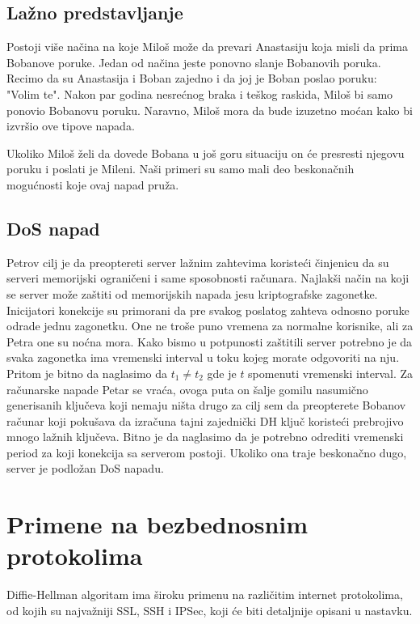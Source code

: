 \documentclass[a4paper]{article}
\begin{document}
\subsection{Lažno predstavljanje}
Postoji više načina na koje Miloš može da prevari Anastasiju koja misli da prima Bobanove poruke. Jedan od načina jeste ponovno slanje Bobanovih poruka. Recimo da su Anastasija i Boban zajedno i da joj je Boban poslao poruku: "Volim te". Nakon par godina nesrećnog braka i teškog raskida, Miloš 
 bi samo ponovio Bobanovu poruku. Naravno, Miloš mora da bude izuzetno moćan kako bi izvršio ove tipove napada.

Ukoliko Miloš želi da dovede Bobana u još goru situaciju on će presresti njegovu poruku i poslati je Mileni. Naši primeri su samo mali deo beskonačnih mogućnosti koje ovaj napad pruža.


\subsection{DoS napad}
Petrov cilj je da preoptereti server lažnim zahtevima koristeći činjenicu da su serveri memorijski ograničeni i same sposobnosti računara. Najlakši način na koji se server može zaštiti od memorijskih napada jesu kriptografske zagonetke. Inicijatori konekcije su primorani da pre svakog poslatog zahteva odnosno poruke odrade jednu zagonetku. One ne troše puno vremena za normalne korisnike, ali za Petra one su noćna mora. Kako bismo u potpunosti zaštitili server potrebno je da svaka zagonetka ima vremenski interval u toku kojeg morate odgovoriti na nju. Pritom je bitno da naglasimo da $t_1 \neq t_2$ gde je $t$ spomenuti vremenski interval. Za računarske napade Petar se vraća, ovoga puta on šalje gomilu nasumično generisanih ključeva koji nemaju ništa drugo za cilj sem da preopterete Bobanov računar koji pokušava da izračuna tajni zajednički DH ključ koristeći prebrojivo mnogo lažnih ključeva. Bitno je da naglasimo da je potrebno odrediti vremenski period za koji konekcija sa serverom postoji. Ukoliko ona traje beskonačno dugo, server je podložan DoS napadu.

\section{Primene na bezbednosnim protokolima}
\label{sec:primene}

Diffie-Hellman algoritam ima široku primenu na različitim internet protokolima, od kojih su najvažniji SSL, SSH i IPSec, koji će biti detaljnije opisani u nastavku.
\end{document}
